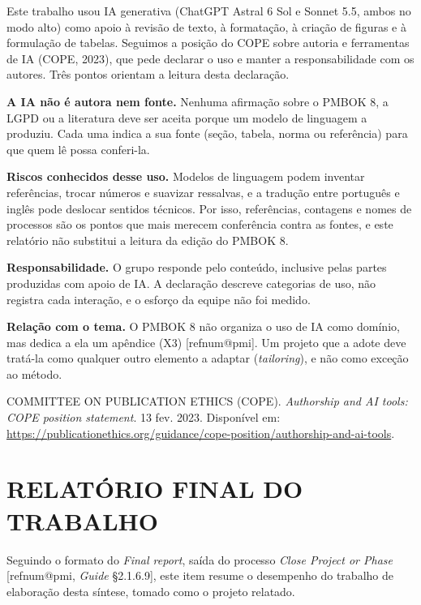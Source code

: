 \documentclass[12pt,a4paper,article,oneside,english,brazil]{abntex2}
\makeatletter
\newcommand{\refnum}[1]{\csname refnum@#1\endcsname}
\newcommand{\cit}[1]{[\refnum{#1}]}
\makeatother
\begin{document}
Este trabalho usou IA generativa (ChatGPT Astral 6 Sol e Sonnet 5.5, ambos no modo alto) como apoio à revisão de texto, à formatação, à criação de figuras e à formulação de tabelas. Seguimos a posição do COPE sobre autoria e ferramentas de IA (COPE, 2023), que pede declarar o uso e manter a responsabilidade com os autores. Três pontos orientam a leitura desta declaração.

\textbf{A IA não é autora nem fonte.} Nenhuma afirmação sobre o PMBOK 8, a LGPD ou a literatura deve ser aceita porque um modelo de linguagem a produziu. Cada uma indica a sua fonte (seção, tabela, norma ou referência) para que quem lê possa conferi-la.

\textbf{Riscos conhecidos desse uso.} Modelos de linguagem podem inventar referências, trocar números e suavizar ressalvas, e a tradução entre português e inglês pode deslocar sentidos técnicos. Por isso, referências, contagens e nomes de processos são os pontos que mais merecem conferência contra as fontes, e este relatório não substitui a leitura da edição do PMBOK 8.

\textbf{Responsabilidade.} O grupo responde pelo conteúdo, inclusive pelas partes produzidas com apoio de IA. A declaração descreve categorias de uso, não registra cada interação, e o esforço da equipe não foi medido.

\textbf{Relação com o tema.} O PMBOK 8 não organiza o uso de IA como domínio, mas dedica a ela um apêndice (X3) \cit{pmi}. Um projeto que a adote deve tratá-la como qualquer outro elemento a adaptar (\textit{tailoring}), e não como exceção ao método.

\begingroup\small\noindent COMMITTEE ON PUBLICATION ETHICS (COPE). \textit{Authorship and AI tools: COPE position statement}. 13 fev. 2023. Disponível em: \url{https://publicationethics.org/guidance/cope-position/authorship-and-ai-tools}.\par\endgroup
\fi

\section{RELATÓRIO FINAL DO TRABALHO}

Seguindo o formato do \textit{Final report}, saída do processo \textit{Close Project or Phase} [\refnum{pmi}, \textit{Guide} §2.1.6.9], este item resume o desempenho do trabalho de elaboração desta síntese, tomado como o projeto relatado.
\end{document}

